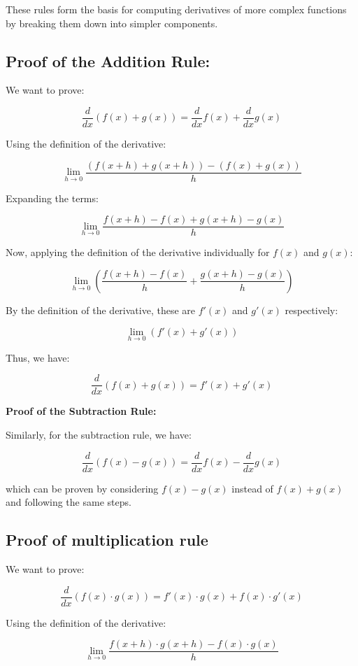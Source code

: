 These rules form the basis for computing derivatives of more complex functions by breaking them down into simpler components.



\subsection{\textbf{Proof of the Addition Rule:}}

We want to prove:

\[
\frac{d}{dx}(f(x) + g(x)) = \frac{d}{dx}f(x) + \frac{d}{dx}g(x)
\]

Using the definition of the derivative:

\[
\lim_{{h \to 0}} \frac{(f(x + h) + g(x + h)) - (f(x) + g(x))}{h}
\]

Expanding the terms:

\[
\lim_{{h \to 0}} \frac{f(x + h) - f(x) + g(x + h) - g(x)}{h}
\]

Now, applying the definition of the derivative individually for \( f(x) \) and \( g(x) \):

\[
\lim_{{h \to 0}} \left(\frac{f(x + h) - f(x)}{h} + \frac{g(x + h) - g(x)}{h}\right)
\]

By the definition of the derivative, these are \( f'(x) \) and \( g'(x) \) respectively:

\[
\lim_{{h \to 0}} (f'(x) + g'(x))
\]

Thus, we have:

\[
\frac{d}{dx}(f(x) + g(x)) = f'(x) + g'(x)
\]

\textbf{Proof of the Subtraction Rule:}

Similarly, for the subtraction rule, we have:

\[
\frac{d}{dx}(f(x) - g(x)) = \frac{d}{dx}f(x) - \frac{d}{dx}g(x)
\]

which can be proven by considering \( f(x) - g(x) \) instead of \( f(x) + g(x) \) and following the same steps.


\subsection{Proof of multiplication rule}

We want to prove:

\[
\frac{d}{dx}(f(x) \cdot g(x)) = f'(x) \cdot g(x) + f(x) \cdot g'(x)
\]

Using the definition of the derivative:

\[
\lim_{{h \to 0}} \frac{f(x + h) \cdot g(x + h) - f(x) \cdot g(x)}{h}
\]

